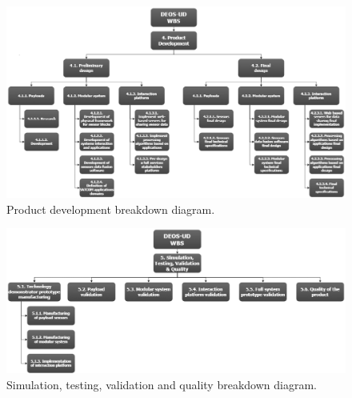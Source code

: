 \begin{landscape}\tiny

\vspace*{\fill}
\begin{figure}[H]
	\centering
	\includegraphics[width=1.5\textwidth]{./sections/2.WBS/WBS_Section4}
	\caption[Product development breakdown diagram]{Product development breakdown diagram.}
	\label{fig:WBS_Section4}
\end{figure}
\vspace*{\fill}

\end{landscape}


\begin{landscape}\tiny

\vspace*{\fill}
\begin{figure}[H]
	\centering
	\includegraphics[width=1.5\textwidth]{./sections/2.WBS/WBS_Section5}
	\caption[Simulation, testing, validation and quality breakdown diagram]{Simulation, testing, validation and quality breakdown diagram.}
	\label{fig:WBS_Section5}
\end{figure}
\vspace*{\fill}

\end{landscape}

